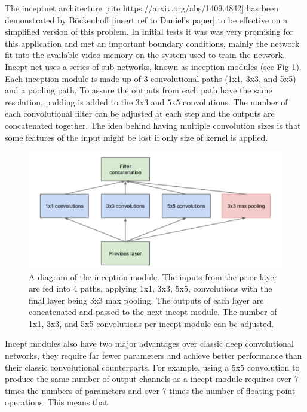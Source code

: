 \label{sec:code:inceptnet}
The inceptnet architecture [cite https://arxiv.org/abs/1409.4842] has been demonstrated by Böckenhoff [insert ref to Daniel's paper] to be effective on a simplified version of this problem.
In initial tests it was was very promising for this application and met an important boundary conditions, mainly the network fit into the available video memory on the system used to train the network.
Incept net uses a series of sub-networks, known as inception modules (see Fig \ref{fig:code:inceptmodule}).
Each inception module is made up of 3 convolutional paths (1x1, 3x3, and 5x5) and a pooling path.
To assure the outputs from each path have the same resolution, padding is added to the 3x3 and 5x5 convolutions.
The number of each convolutional filter can be adjusted at each step and the outputs are concatenated together.
The idea behind having multiple convolution sizes is that some features of the input might be lost if only size of kernel is applied.

\begin{figure}[htb]
    \includegraphics[width=\textwidth]{images/incept-simple.png}
    \caption{A diagram of the inception module. The inputs from the prior layer are fed into 4 paths, applying 1x1, 3x3, 5x5, convolutions with the final layer being 3x3 max pooling. The outputs of each layer are concatenated and passed to the next incept module. The number of 1x1, 3x3, and 5x5 convolutions per incept module can be adjusted.}
    \label{fig:code:inceptmodule}
\end{figure}

Incept modules also have two major advantages over classic deep convolutional networks, they require far fewer parameters and achieve better performance than their classic convolutional counterparts.
For example, using a 5x5 convolution to produce the same number of output channels as a incept module requires over 7 times the numbers of parameters and over 7 times the number of floating point operations.
This means that




